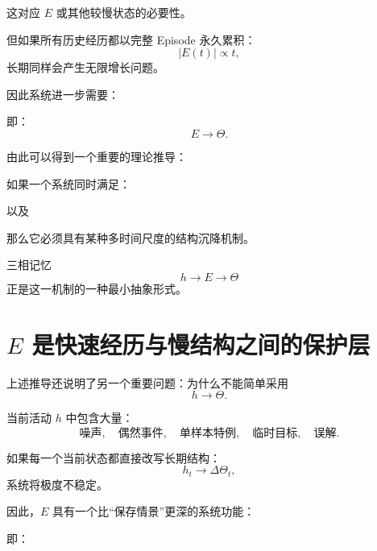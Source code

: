 这对应 $E$ 或其他较慢状态的必要性。

但如果所有历史经历都以完整 Episode 永久累积：
\[
|E(t)|\propto t,
\]
长期同样会产生无限增长问题。

因此系统进一步需要：
\begin{statementbox}
\centering
{}
\end{statementbox}

即：
\[
\boxed{
E\rightarrow\Theta.
}
\]

由此可以得到一个重要的理论推导：

如果一个系统同时满足：
\begin{statementbox}
\centering
{}
\end{statementbox}
\begin{statementbox}
\centering
{}
\end{statementbox}
以及
\begin{statementbox}
\centering
{}
\end{statementbox}
那么它必须具有某种多时间尺度的结构沉降机制。

三相记忆
\[
h\rightarrow E\rightarrow\Theta
\]
正是这一机制的一种最小抽象形式。

\section{$E$ 是快速经历与慢结构之间的保护层}

上述推导还说明了另一个重要问题：为什么不能简单采用
\[
h\rightarrow\Theta.
\]

当前活动 $h$ 中包含大量：
\[
\text{噪声},
\quad
\text{偶然事件},
\quad
\text{单样本特例},
\quad
\text{临时目标},
\quad
\text{误解}.
\]

如果每一个当前状态都直接改写长期结构：
\[
h_t\rightarrow\Delta\Theta_t,
\]
系统将极度不稳定。

因此，$E$ 具有一个比“保存情景”更深的系统功能：
\begin{statementbox}
\centering
{}
\end{statementbox}

即：
\begin{statementbox}
\centering
{}
\end{statementbox}

